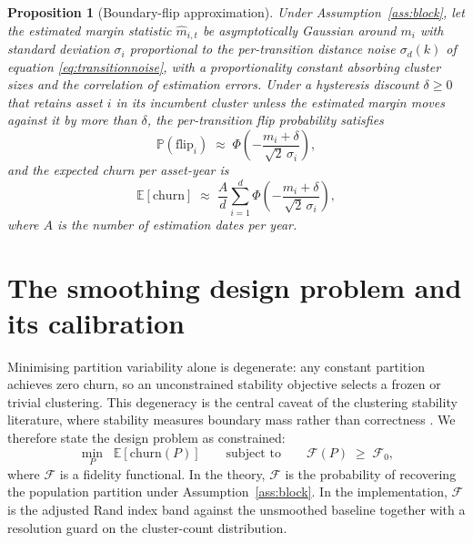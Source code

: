 \documentclass[11pt]{article}
\newtheorem{proposition}{Proposition}
\theoremstyle{remark}
\newcommand{\E}{\mathbb{E}}
\newcommand{\Prob}{\mathbb{P}}
\begin{document}
\begin{proposition}[Boundary-flip approximation]
\label{prop:flip}
Under Assumption~\ref{ass:block}, let the estimated margin statistic
$\widehat{m}_{i,t}$ be asymptotically Gaussian around $m_i$ with standard
deviation $\sigma_i$ proportional to the per-transition distance noise
$\sigma_d(k)$ of equation \eqref{eq:transitionnoise}, with a proportionality
constant absorbing cluster sizes and the correlation of estimation errors.
Under a hysteresis discount $\delta \geq 0$ that retains asset $i$ in its
incumbent cluster unless the estimated margin moves against it by more than
$\delta$, the per-transition flip probability satisfies
\begin{equation}
\Prob\!\left(\text{flip}_i\right)
\;\approx\; \Phi\!\left( - \frac{m_i + \delta}{\sqrt{2}\,\sigma_i} \right),
\label{eq:flipprob}
\end{equation}
and the expected churn per asset-year is
\begin{equation}
\E\!\left[\text{churn}\right]
\;\approx\; \frac{A}{d} \sum_{i=1}^{d}
\Phi\!\left( - \frac{m_i + \delta}{\sqrt{2}\,\sigma_i} \right),
\label{eq:expectedchurn}
\end{equation}
where $A$ is the number of estimation dates per year.
\end{proposition}


\section{The smoothing design problem and its calibration}
\label{sec:smoothing}

Minimising partition variability alone is degenerate: any constant partition
achieves zero churn, so an unconstrained stability objective selects a frozen
or trivial clustering. This degeneracy is the central caveat of the clustering
stability literature, where stability measures boundary mass rather than
correctness \citep{bendavid2006sober, vonluxburg2010clustering}. We therefore
state the design problem as constrained:
\begin{equation}
\min_{P} \;\; \E\!\left[\text{churn}(P)\right]
\qquad \text{subject to} \qquad
\mathcal{F}(P) \;\geq\; \mathcal{F}_0,
\label{eq:designproblem}
\end{equation}
where $\mathcal{F}$ is a fidelity functional. In the theory, $\mathcal{F}$ is
the probability of recovering the population partition under
Assumption~\ref{ass:block}. In the implementation, $\mathcal{F}$ is the
adjusted Rand index band against the unsmoothed baseline together with a
resolution guard on the cluster-count distribution.
\end{document}
